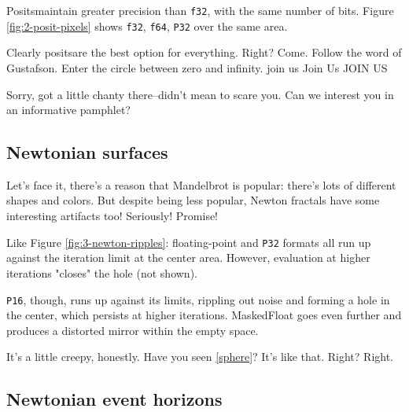 \documentclass[sigconf,authorversion,nonacm]{acmart}
\begin{document}
Posits\texttrademark  maintain greater precision than \texttt{f32}, with the same number of bits.
Figure \ref{fig:2-posit-pixels} shows \texttt{f32}, \texttt{f64}, \texttt{P32} over the same area.

Clearly posits\texttrademark are the best option for everything. Right? Come. Follow the word of Gustafson. \cite{posit} Enter the circle between zero and infinity. join us Join Us JOIN US 

Sorry, got a little chanty there--didn't mean to scare you. Can we interest you in an informative pamphlet? \cite{cult}

\setcounter{subsection}{427734374}
\subsection{Newtonian surfaces}

Let's face it, there's a reason that Mandelbrot is popular: there's lots of different shapes and colors.
But despite being less popular, Newton fractals have some interesting artifacts too! Seriously! Promise!

Like Figure \ref{fig:3-newton-ripples}: floating-point and \texttt{P32} formats all run up against the iteration limit at the center area. However, evaluation at higher iterations "closes" the hole (not shown).

\texttt{P16}, though, runs up against its limits, rippling out noise and forming a hole in the center, which persists at higher iterations. MaskedFloat goes even further and produces a distorted mirror within the empty space.

It's a little creepy, honestly. Have you seen \ref{sphere}? It's like that. Right? Right.

\setcounter{subsection}{572265624}
\subsection{Newtonian event horizons}
\end{document}
